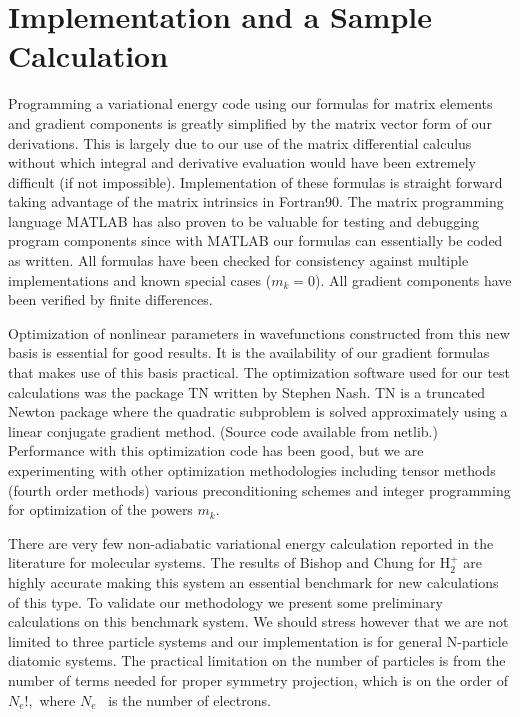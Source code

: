 \documentclass[12pt]{article}
\begin{document}
\section{Implementation and a Sample Calculation}

Programming a variational energy code using our formulas for matrix elements
and gradient components is greatly simplified by the matrix vector form of our
derivations. This is largely due to our use of the matrix differential
calculus without which integral and derivative evaluation would have been
extremely difficult (if not impossible). Implementation of these formulas is
straight forward taking advantage of the matrix intrinsics in Fortran90. The
matrix programming language MATLAB\cite{MATLAB} has also proven to be valuable
for testing and debugging program components since with MATLAB our formulas
can essentially be coded as written. All formulas have been checked for
consistency against multiple implementations and known special cases
($m_{k}=0$). All gradient components have been verified by finite differences. 

Optimization of nonlinear parameters in wavefunctions constructed from this
new basis is essential for good results. It is the availability of our
gradient formulas that makes use of this basis practical. The optimization
software used for our test calculations was the package TN written by Stephen
Nash\cite{NashTN}. TN is a truncated Newton package where the quadratic
subproblem is solved approximately using a linear conjugate gradient method.
(Source code available from netlib\cite{netlib}.) Performance with this
optimization code has been good, but we are experimenting with other
optimization methodologies including tensor methods (fourth order methods)
various preconditioning schemes and integer programming for optimization of
the powers $m_{k}$.

There are very few non-adiabatic variational energy calculation reported in
the literature for molecular systems. The results of Bishop and
Chung\cite{Bishop77} for H$_{2}^{+}$ are highly accurate making this system an
essential benchmark for new calculations of this type. To validate our
methodology we present some preliminary calculations on this benchmark system.
We should stress however that we are not limited to three particle systems and
our implementation is for general N-particle diatomic systems. The practical
limitation on the number of particles is from the number of terms needed for
proper symmetry projection, which is on the order of $N_{e}!,$ where $N_{e}$
\ is the number of electrons.
\end{document}
